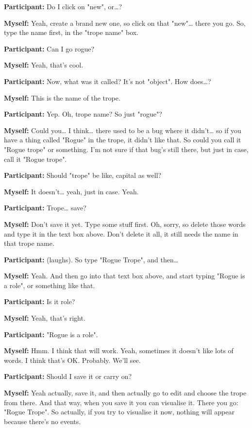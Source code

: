 \documentclass[11pt]{report}
\begin{document}
\begin{linenumbers}
\textbf{Participant:} Do I click on "new", or\ldots{}?

\textbf{Myself:} Yeah, create a brand new one, so click on that "new"\ldots{} there you go. So, type the name first, in the "trope name" box.

\textbf{Participant:} Can I go rogue?

\textbf{Myself:} Yeah, that's cool.

\textbf{Participant:} Now, what was it called? It's not "object". How does\ldots{}?

\textbf{Myself:} This is the name of the trope.

\textbf{Participant:} Yep. Oh, trope name? So just "rogue"?

\textbf{Myself:} Could you\ldots{} I think\ldots{} there used to be a bug where it didn't\ldots{} so if you have a thing called "Rogue" in the trope, it didn't like that. So could you call it "Rogue trope" or something. I'm not sure if that bug's still there, but just in case, call it "Rogue trope".

\textbf{Participant:} Should "trope" be like, capital as well?

\textbf{Myself:} It doesn't\ldots{} yeah, just in case. Yeah.

\textbf{Participant:} Trope\ldots{} save?

\textbf{Myself:} Don't save it yet. Type some stuff first. Oh, sorry, so delete those words and type it in the text box above. Don't delete it all, it still needs the name in that trope name.

\textbf{Participant:} (laughs). So type "Rogue Trope", and then\ldots{}

\textbf{Myself:} Yeah. And then go into that text box above, and start typing "Rogue is a role", or something like that.

\textbf{Participant:} Is it role?

\textbf{Myself:} Yeah, that's right.

\textbf{Participant:} "Rogue is a role".

\textbf{Myself:} Hmm. I think that will work. Yeah, sometimes it doesn't like lots of words. I think that's OK. Probably. We'll see.

\textbf{Participant:} Should I save it or carry on?

\textbf{Myself:} Yeah actually, save it, and then actually go to edit and choose the trope from there. And that way, when you save it you can visualise it. There you go: "Rogue Trope". So actually, if you try to visualise it now, nothing will appear because there's no events.


\end{linenumbers}
\end{document}
